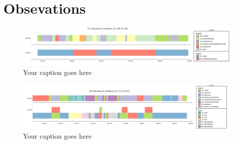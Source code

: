 
\section{Obsevations}

\begin{figure}
\includegraphics[width=\textwidth]{figures/P1timeplot}
\caption{Your caption goes here}
\end{figure}

\begin{figure}
\includegraphics[width=\textwidth]{figures/P6timeplot}
\caption{Your caption goes here}
\end{figure}

